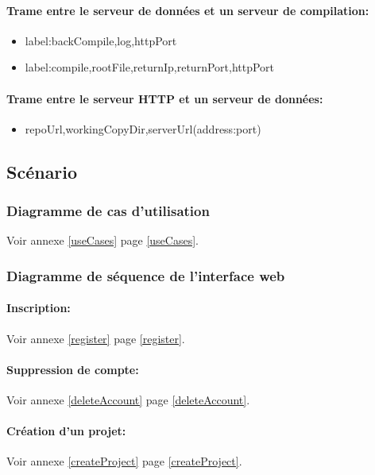 \documentclass[a4paper,12pt]{article}
\begin{document}
\paragraph{Trame entre le serveur de données et un serveur de compilation:}
\begin{itemize}
 \item label:backCompile,log,httpPort
 \item label:compile,rootFile,returnIp,returnPort,httpPort
\end{itemize}

\paragraph{Trame entre le serveur HTTP et un serveur de données:}
\begin{itemize}
 \item repoUrl,workingCopyDir,serverUrl(address:port)
\end{itemize}

\subsection{Scénario}
\subsubsection{Diagramme de cas d'utilisation}
Voir annexe \ref{useCases} page \ref{useCases}.

\subsubsection{Diagramme de séquence de l'interface web}

\paragraph{Inscription:\\}
Voir annexe \ref{register} page \ref{register}.

\paragraph{Suppression de compte:\\}
Voir annexe \ref{deleteAccount} page \ref{deleteAccount}.

\paragraph{Création d'un projet:\\}
Voir annexe \ref{createProject} page \ref{createProject}.
\end{document}
